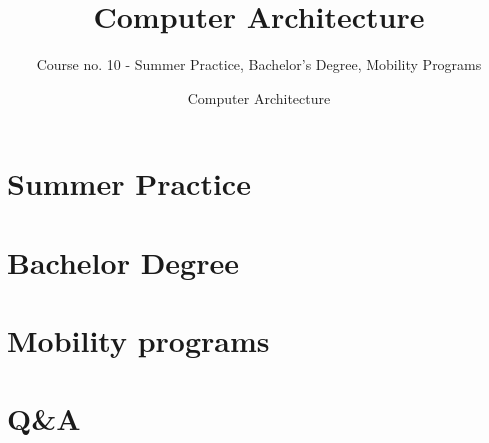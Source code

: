 \documentclass[usenames,dvipsnames]{beamer}             %
\title[Computer Architecture] %
{Computer Architecture}
\subtitle{Course no. 10 - Summer Practice, Bachelor's Degree, Mobility Programs}
\author[Ștefan-Dan Ciocîrlan] %
{}
\institute[NUSTPB] %
{
  \inst{}%
  National University of Science and Technology\\
  POLITEHNICA Bucharest
}
\date[NUSTPB 2024] %
{Computer Architecture}
\begin{document}
\frame{\titlepage}

\section{Summer Practice}


\section{Bachelor Degree}


\section{Mobility programs}




\section{Q\&A}
\begin{frame}
\end{frame}

\end{document}
